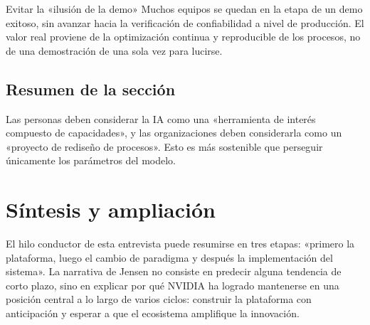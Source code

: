 \documentclass[a4paper]{article}
\begin{document}
\begin{warningbox}{Evitar la «ilusión de la demo»}
Muchos equipos se quedan en la etapa de un demo exitoso, sin avanzar hacia la verificación de confiabilidad a nivel de producción. El valor real proviene de la optimización continua y reproducible de los procesos, no de una demostración de una sola vez para lucirse.
\end{warningbox}

\subsection{Resumen de la sección}
Las personas deben considerar la IA como una «herramienta de interés compuesto de capacidades», y las organizaciones deben considerarla como un «proyecto de rediseño de procesos». Esto es más sostenible que perseguir únicamente los parámetros del modelo.

\section{Síntesis y ampliación}

El hilo conductor de esta entrevista puede resumirse en tres etapas: «primero la plataforma, luego el cambio de paradigma y después la implementación del sistema». La narrativa de Jensen no consiste en predecir alguna tendencia de corto plazo, sino en explicar por qué NVIDIA ha logrado mantenerse en una posición central a lo largo de varios ciclos: construir la plataforma con anticipación y esperar a que el ecosistema amplifique la innovación.
\end{document}
